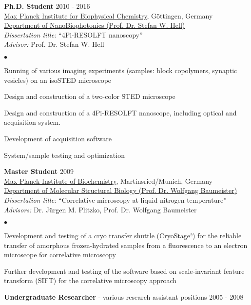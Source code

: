 \documentclass[margin,line]{res}
\newenvironment{list2}{
  \begin{list}{$\bullet$}{%
      \setlength{\itemsep}{0in}
      \setlength{\parsep}{0in} \setlength{\parskip}{0in}
      \setlength{\topsep}{0in} \setlength{\partopsep}{0in} 
      \setlength{\leftmargin}{0.2in}}}{\end{list}}
\begin{document}
\begin{resume}
{\bf Ph.D. Student} \hfill {2010 - 2016}\\
\href{https://www.mpibpc.mpg.de/en}{Max Planck Institute for Biophysical Chemistry}, Göttingen, Germany\\
\href{http://www.4pi.de/}{Department of NanoBiophotonics (Prof. Dr. Stefan W. Hell)}\\
{\it Dissertation title:} “4Pi-RESOLFT nanoscopy”\\
{\it Advisor:} Prof. Dr. Stefan W. Hell\\
\vspace*{-2mm}
\begin{list2}
\vspace*{-1mm}
\item Running of various imaging experiments (samples: block copolymers, synaptic vesicles) on an isoSTED microscope
\item Design and construction of a two-color STED microscope
\item Design and construction of a 4Pi-RESOLFT nanoscope, including optical and acquisition system.
\item Development of acquisition software
\item System/sample testing and optimization
\end{list2}
{\bf Master Student} \hfill {2009}\\
\href{https://www.biochem.mpg.de/en}{Max Planck Institute of Biochemistry}, Martinsried/Munich, Germany\\
\href{https://www.biochem.mpg.de/baumeister}{Department of Molecular Structural Biology (Prof. Dr. Wolfgang Baumeister)}\\
{\it Dissertation title:} “Correlative microscopy at liquid nitrogen temperature”\\
{\it Advisors:} Dr. Jürgen M. Plitzko, Prof. Dr. Wolfgang Baumeister\\
\vspace*{-2mm}
\begin{list2}
\vspace*{-1mm}
\item Development and testing of a cryo transfer shuttle (CryoStage²) for the reliable transfer of amorphous frozen-hydrated samples from a fluorescence to an electron microscope for correlative microscopy
\item Further development and testing of the software based on scale-invariant feature transform (SIFT) for the correlative microscopy approach
\end{list2}
{\bf Undergraduate Researcher} - various research assistant positions \hfill {2005 - 2008}\\

\end{resume}
\end{document}

